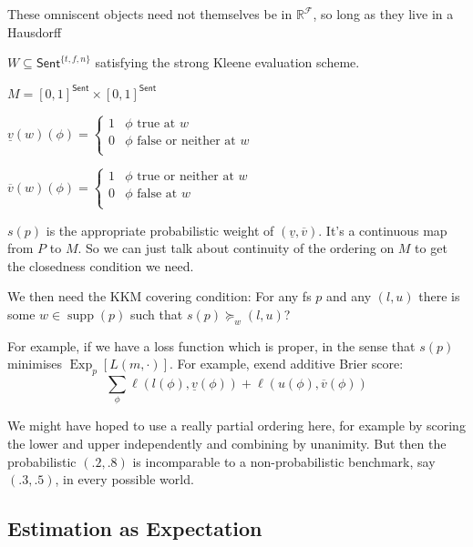 \documentclass[11pt]{article}
\theoremstyle{definition}
\theoremstyle{remark}
\newcommand{\R}{\mathbb R}
\newcommand{\supp}{\operatorname{supp}}
\newcommand{\Exp}{\operatorname{Exp}}
\begin{document}
These omniscent objects need not themselves be in $\R^\mathcal{F}$, so long as they live in a Hausdorff 





$W\subseteq \mathsf{Sent}^{\{t,f,n\}}$ satisfying the strong Kleene evaluation scheme. 

$M=[0,1]^{\mathsf{Sent}}\times [0,1]^{\mathsf{Sent}}$

$\underline{v}(w)(\phi)=\begin{cases}
	1&\text{$\phi$ true at $w$}\\
	0&\text{$\phi$ false or neither at $w$}\\
\end{cases}$ 

$\overline{v}(w)(\phi)=\begin{cases}
	1&\text{$\phi$ true or neither at $w$}\\
	0&\text{$\phi$ false at $w$}\\
\end{cases}$ 


$s(p)$ is the appropriate probabilistic weight of $(\underline{v},\overline{v})$. It's a continuous map from $P$ to $M$. So we can just talk about continuity of the ordering on $M$ to get the closedness condition we need. 

We then need the KKM covering condition: For any fs $p$ and any $(l,u)$ there is some $w\in \supp(p)$ such that $s(p)\succeq_w (l,u)$?

For example, if we have a loss function which is proper, in the sense that $s(p)$ minimises $\Exp_p[L(m,\cdot)]$. For example, exend additive Brier score:
$$\sum_\phi \ell(l(\phi),\underline{v}(\phi))+\ell(u(\phi),\overline{v}(\phi))$$

We might have hoped to use a really partial ordering here, for example by scoring the lower and upper independently and combining by unanimity. But then the probabilistic $(.2,.8)$ is incomparable to a non-probabilistic benchmark, say $(.3,.5)$, in every possible world.  


%


\subsection{Estimation as Expectation}
\end{document}
